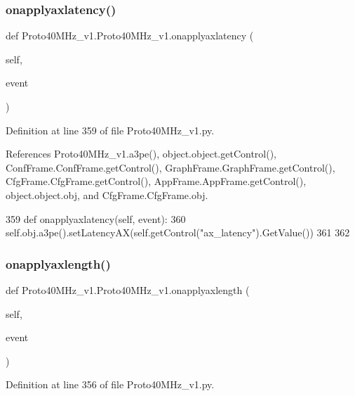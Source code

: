 \subsubsection{\texorpdfstring{onapplyaxlatency()}{onapplyaxlatency()}}
{\footnotesize\ttfamily def Proto40\+M\+Hz\+\_\+v1.\+Proto40\+M\+Hz\+\_\+v1.\+onapplyaxlatency (\begin{DoxyParamCaption}\item[{}]{self,  }\item[{}]{event }\end{DoxyParamCaption})}



Definition at line 359 of file Proto40\+M\+Hz\+\_\+v1.\+py.



References Proto40\+M\+Hz\+\_\+v1.\+a3pe(), object.\+object.\+get\+Control(), Conf\+Frame.\+Conf\+Frame.\+get\+Control(), Graph\+Frame.\+Graph\+Frame.\+get\+Control(), Cfg\+Frame.\+Cfg\+Frame.\+get\+Control(), App\+Frame.\+App\+Frame.\+get\+Control(), object.\+object.\+obj, and Cfg\+Frame.\+Cfg\+Frame.\+obj.


\begin{DoxyCode}
359     \textcolor{keyword}{def }onapplyaxlatency(self, event):
360         self.obj.a3pe().setLatencyAX(self.getControl(\textcolor{stringliteral}{"ax\_latency"}).GetValue())
361 
362 
\end{DoxyCode}
\mbox{\label{classProto40MHz__v1_1_1Proto40MHz__v1_a290b605ea5c60d320cb32d8c9cd94bc8}} 
\subsubsection{\texorpdfstring{onapplyaxlength()}{onapplyaxlength()}}
{\footnotesize\ttfamily def Proto40\+M\+Hz\+\_\+v1.\+Proto40\+M\+Hz\+\_\+v1.\+onapplyaxlength (\begin{DoxyParamCaption}\item[{}]{self,  }\item[{}]{event }\end{DoxyParamCaption})}



Definition at line 356 of file Proto40\+M\+Hz\+\_\+v1.\+py.



